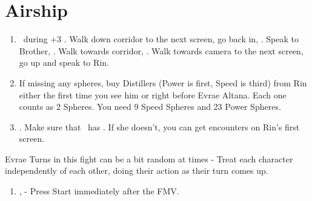 \chapter{Airship}

\begin{enumerate}
	\item \sd\ during \cs+3 \skippablefmv. Walk down corridor to the next screen, go back in, \sd. Speak to Brother, \sd. Walk towards corridor, \sd. Walk towards camera to the next screen, go up and speak to Rin.
	\item If missing any spheres, buy Distillers (Power is first, Speed is third) from Rin either the first time you see him or right before Evrae Altana. Each one counts as 2 Spheres. You need 9 Speed Spheres and 23 Power Spheres.
	\item \save. Make sure that \rikku\ has \od. If she doesn't, you can get encounters on Rin's first screen.
\end{enumerate}
\begin{battle}[32000]{Evrae}
	Turns in this fight can be a bit random at times - Treat each character independently of each other, doing their action as their turn comes up.
	\begin{itemize}
	\end{itemize}
\end{battle}
\begin{enumerate}[resume]
	\item \sd, \skippablefmv - Press Start immediately after the FMV.
\end{enumerate}